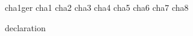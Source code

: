 \documentclass[USenglish]{ACIN_diploma/ACIN_diploma_thesis}
\begin{document}
\maketitle

{cha1ger}
{cha1}
{cha2}
{cha3}
{cha4}
{cha5}
{cha6}
{cha7}
{cha8}

\printbibliography[title={Bibliography}]

{declaration}
\end{document}
